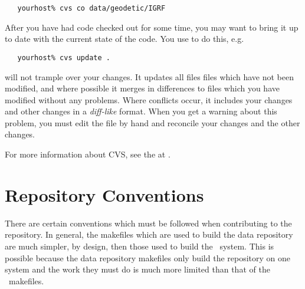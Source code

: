 \begin{verbatim}
   yourhost% cvs co data/geodetic/IGRF
\end{verbatim}

After you have had code checked out for some time, you may want to bring it
up to date with the current state of the code. You use  to do
this, e.g.

\begin{verbatim}
   yourhost% cvs update .
\end{verbatim}

\noindent
{} will not trample over your changes. It updates all files
files which have not been modified, and where possible it merges in
differences to files which you have modified without any problems. Where
conflicts occur, it includes your changes and other changes in
a \textit{diff-like} format. When you get a warning about this problem,
you must edit the file by hand and reconcile your changes and the other
changes.

For more information about CVS, see
the 
at .


\section{Repository Conventions}
\label{data repository conventions}

There are certain conventions which must be followed when contributing to
the repository. In general, the makefiles which are used to build the
data repository are much simpler, by design, then those used to build
the \aipspp\ system. This is possible because the data repository makefiles
only build the repository on one system and the work they must do is much
more limited than that of the \aipspp\ makefiles.

